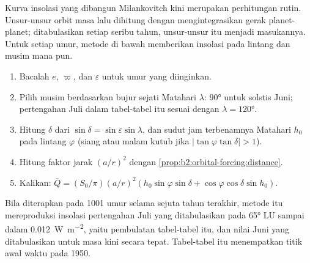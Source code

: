 Kurva insolasi yang dibangun Milankovitch kini merupakan perhitungan rutin. Unsur-unsur orbit
masa lalu dihitung dengan mengintegrasikan gerak planet-planet; ditabulasikan setiap seribu tahun,
unsur-unsur itu menjadi masukannya. Untuk setiap umur, metode di bawah memberikan insolasi pada lintang dan musim mana pun.

\begin{method}\label{met:b2:orbital-forcing:curve}
\begin{enumerate}
  \item Bacalah $e$, $\varpi$, dan $\varepsilon$ untuk umur yang diinginkan.
  \item Pilih musim berdasarkan bujur sejati Matahari $\lambda$: \ang{90} untuk solstis Juni;
        pertengahan Juli dalam tabel-tabel itu sesuai dengan $\lambda = \ang{120}$.
  \item Hitung $\delta$ dari $\sin\delta = \sin\varepsilon\sin\lambda$, dan sudut jam
        terbenamnya Matahari $h_0$ pada lintang $\varphi$ (siang atau malam kutub jika $|\tan\varphi\tan\delta| > 1$).
  \item Hitung faktor jarak $(a/r)^2$ dengan \cref{prop:b2:orbital-forcing:distance}.
  \item Kalikan: $\bar Q = (S_0/\pi)(a/r)^2(h_0\sin\varphi\sin\delta +
        \cos\varphi\cos\delta\sin h_0)$.
\end{enumerate}
\end{method}

Bila diterapkan pada 1001 umur selama sejuta tahun terakhir, metode itu mereproduksi insolasi pertengahan Juli yang ditabulasikan
pada \ang{65} LU sampai dalam \qty{0.012}{W.m^{-2}}, yaitu pembulatan tabel-tabel itu, dan
nilai Juni yang ditabulasikan untuk masa kini secara tepat. Tabel-tabel itu menempatkan titik awal waktu pada 1950.

